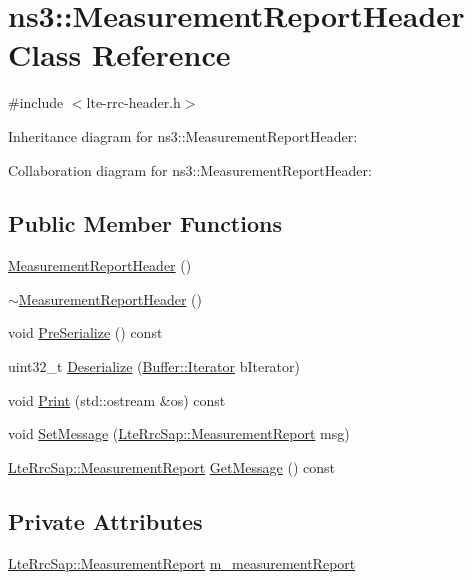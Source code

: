 \hypertarget{classns3_1_1MeasurementReportHeader}{}\section{ns3\+:\+:Measurement\+Report\+Header Class Reference}
\label{classns3_1_1MeasurementReportHeader}


{\ttfamily \#include $<$lte-\/rrc-\/header.\+h$>$}



Inheritance diagram for ns3\+:\+:Measurement\+Report\+Header\+:


Collaboration diagram for ns3\+:\+:Measurement\+Report\+Header\+:
\subsection*{Public Member Functions}
\begin{DoxyCompactItemize}
\item 
\hyperlink{classns3_1_1MeasurementReportHeader_adf91cb11a5b68f168cf25a1aa0f85f98}{Measurement\+Report\+Header} ()
\item 
\hyperlink{classns3_1_1MeasurementReportHeader_a32d9570cde45eb22607d758b54116bc4}{$\sim$\+Measurement\+Report\+Header} ()
\item 
void \hyperlink{classns3_1_1MeasurementReportHeader_a701a3a645a8085fa69e6923b8db5776c}{Pre\+Serialize} () const 
\item 
uint32\+\_\+t \hyperlink{classns3_1_1MeasurementReportHeader_a432b1c3563184d6f9fc0a7e3c75c9eaf}{Deserialize} (\hyperlink{classns3_1_1Buffer_1_1Iterator}{Buffer\+::\+Iterator} b\+Iterator)
\item 
void \hyperlink{classns3_1_1MeasurementReportHeader_a21514e1a75e23f40f82719ea4631cb93}{Print} (std\+::ostream \&os) const 
\item 
void \hyperlink{classns3_1_1MeasurementReportHeader_adf03e2e58b351602d7f72fa19a786be1}{Set\+Message} (\hyperlink{structns3_1_1LteRrcSap_1_1MeasurementReport}{Lte\+Rrc\+Sap\+::\+Measurement\+Report} msg)
\item 
\hyperlink{structns3_1_1LteRrcSap_1_1MeasurementReport}{Lte\+Rrc\+Sap\+::\+Measurement\+Report} \hyperlink{classns3_1_1MeasurementReportHeader_ac9f3218f3e2f100a253d9c26827ba770}{Get\+Message} () const 
\end{DoxyCompactItemize}
\subsection*{Private Attributes}
\begin{DoxyCompactItemize}
\item 
\hyperlink{structns3_1_1LteRrcSap_1_1MeasurementReport}{Lte\+Rrc\+Sap\+::\+Measurement\+Report} \hyperlink{classns3_1_1MeasurementReportHeader_a7836c0f2ef3e219fc7ab0fee92e470f5}{m\+\_\+measurement\+Report}
\end{DoxyCompactItemize}
